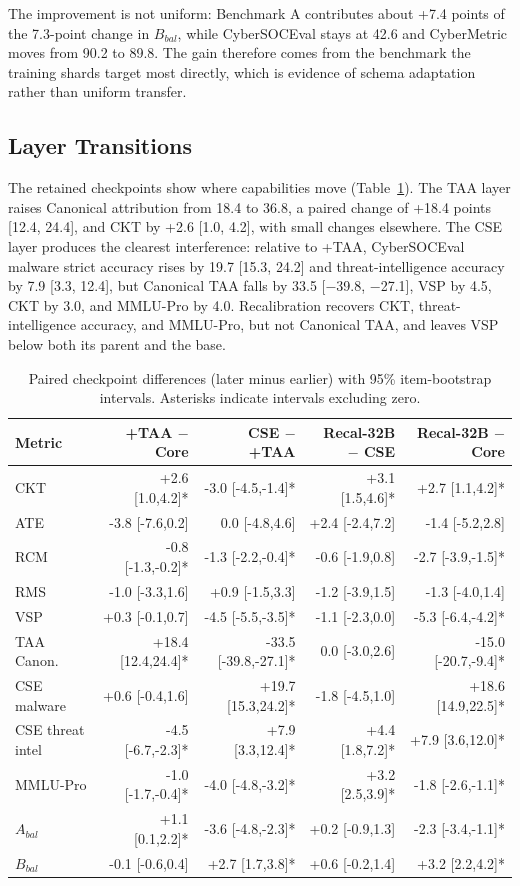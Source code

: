 \documentclass[conference]{IEEEtran}
\begin{document}
The improvement is not uniform: Benchmark A contributes about +7.4 points of the 7.3-point change in $B_{bal}$, while CyberSOCEval stays at 42.6 and CyberMetric moves from 90.2 to 89.8. The gain therefore comes from the benchmark the training shards target most directly, which is evidence of schema adaptation rather than uniform transfer.

\subsection{Layer Transitions}
The retained checkpoints show where capabilities move (Table~\ref{tab:transitions}). The TAA layer raises Canonical attribution from 18.4 to 36.8, a paired change of +18.4 points [12.4, 24.4], and CKT by +2.6 [1.0, 4.2], with small changes elsewhere. The CSE layer produces the clearest interference: relative to +TAA, CyberSOCEval malware strict accuracy rises by 19.7 [15.3, 24.2] and threat-intelligence accuracy by 7.9 [3.3, 12.4], but Canonical TAA falls by 33.5 [$-$39.8, $-$27.1], VSP by 4.5, CKT by 3.0, and MMLU-Pro by 4.0. Recalibration recovers CKT, threat-intelligence accuracy, and MMLU-Pro, but not Canonical TAA, and leaves VSP below both its parent and the base.

\begin{table}[t]
\caption{Paired checkpoint differences (later minus earlier) with 95\% item-bootstrap intervals. Asterisks indicate intervals excluding zero.}
\label{tab:transitions}
\centering
\scriptsize
\setlength{\tabcolsep}{2.5pt}
\begin{tabular}{@{}lrrrr@{}}
\toprule
Metric & +TAA $-$ Core & CSE $-$ +TAA & Recal-32B $-$ CSE & Recal-32B $-$ Core \\
\midrule
CKT & +2.6 [1.0,4.2]* & -3.0 [-4.5,-1.4]* & +3.1 [1.5,4.6]* & +2.7 [1.1,4.2]* \\
ATE & -3.8 [-7.6,0.2] & 0.0 [-4.8,4.6] & +2.4 [-2.4,7.2] & -1.4 [-5.2,2.8] \\
RCM & -0.8 [-1.3,-0.2]* & -1.3 [-2.2,-0.4]* & -0.6 [-1.9,0.8] & -2.7 [-3.9,-1.5]* \\
RMS & -1.0 [-3.3,1.6] & +0.9 [-1.5,3.3] & -1.2 [-3.9,1.5] & -1.3 [-4.0,1.4] \\
VSP & +0.3 [-0.1,0.7] & -4.5 [-5.5,-3.5]* & -1.1 [-2.3,0.0] & -5.3 [-6.4,-4.2]* \\
TAA Canon. & +18.4 [12.4,24.4]* & -33.5 [-39.8,-27.1]* & 0.0 [-3.0,2.6] & -15.0 [-20.7,-9.4]* \\
CSE malware & +0.6 [-0.4,1.6] & +19.7 [15.3,24.2]* & -1.8 [-4.5,1.0] & +18.6 [14.9,22.5]* \\
CSE threat intel & -4.5 [-6.7,-2.3]* & +7.9 [3.3,12.4]* & +4.4 [1.8,7.2]* & +7.9 [3.6,12.0]* \\
MMLU-Pro & -1.0 [-1.7,-0.4]* & -4.0 [-4.8,-3.2]* & +3.2 [2.5,3.9]* & -1.8 [-2.6,-1.1]* \\
$A_{bal}$ & +1.1 [0.1,2.2]* & -3.6 [-4.8,-2.3]* & +0.2 [-0.9,1.3] & -2.3 [-3.4,-1.1]* \\
$B_{bal}$ & -0.1 [-0.6,0.4] & +2.7 [1.7,3.8]* & +0.6 [-0.2,1.4] & +3.2 [2.2,4.2]* \\
\bottomrule
\end{tabular}
\end{table}
\end{document}
